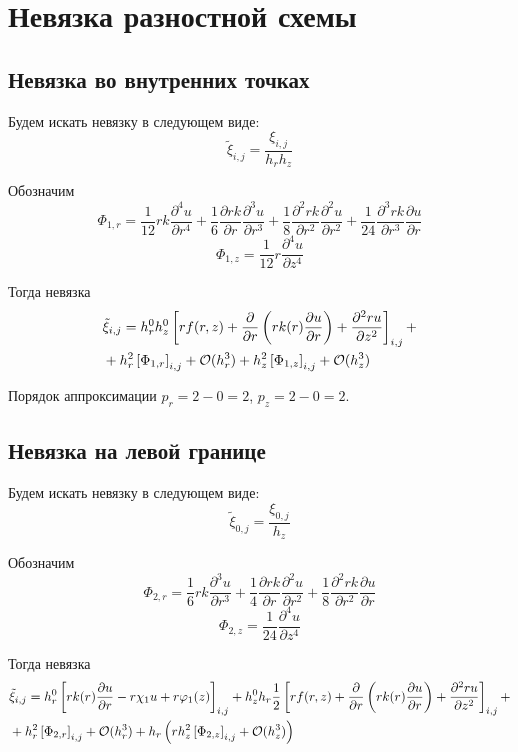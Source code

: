 \section{Невязка разностной схемы}

\subsection{Невязка во внутренних точках}

Будем искать невязку в следующем виде:
\[ \tilde{\xi}_{i, j} = \frac{\xi_{i, j}}{h_r h_z} \]

Обозначим
\[ \Phi_{1,r} = \frac{1}{12} r k \frac{\partial^4 u}{\partial r^4} + \frac{1}{6}\frac{\partial r k}{\partial r}\frac{\partial^3 u}{\partial r^3} + \frac{1}{8} \frac{\partial^2 r k}{\partial r^2}\frac{\partial^2 u}{\partial r^2} + \frac{1}{24} \frac{\partial^3 r k}{\partial r^3}\frac{\partial u}{\partial r} \]
\[ \Phi_{1,z} = \frac{1}{12} r \frac{\partial^4 u}{\partial z^4} \]

Тогда невязка
\begin{align*}
  &\tilde{\xi}_{i, j} = h_r^0 h_z^0 \left[ rf(r, z) + \pdv{}{r} \left ( r k(r) \pdv{u}{r} \right ) + \pdv[2]{ru}{z} \right]_{i, j} + \\
  & + h^2_r\left[ \Phi_{1,r} \right]_{i,j} + \mathcal{O}(h_r^3) + h^2_z \left[ \Phi_{1,z} \right]_{i, j} + \mathcal{O}(h_z^3)
\end{align*}

Порядок аппроксимации $ p_r = 2 - 0 = 2 $, $ p_z = 2 - 0 = 2 $.

\subsection{Невязка на левой границе}

Будем искать невязку в следующем виде:
\[ \tilde{\xi}_{0, j} = \frac{\xi_{0, j}}{h_z} \]

Обозначим
\[ \Phi_{2,r} = \frac{1}{6} rk \frac{\partial^3 u}{ \partial r^3} +   \frac{1}{4} \frac{\partial rk}{ \partial r} \frac{\partial^2 u}{ \partial r^2} + \frac{1}{8} \frac{\partial^2 rk}{ \partial r^2} \frac{\partial u}{ \partial r} \]
\[ \Phi_{2,z} = \frac{1}{24} \frac{\partial^4 u}{ \partial z^4} \]

Тогда невязка
\begin{align*}
  &\tilde{\xi}_{i, j} = h_r^0 \left[ r k(r) \pdv{u}{r} - r \chi_1 u + r \varphi_1(z) \right]_{i, j} + h_z^0 h_r \frac{1}{2} \left[ rf(r, z) + \pdv{}{r} \left ( r k(r) \pdv{u}{r} \right ) + \pdv[2]{ru}{z} \right]_{i, j} + \\
  & + h^2_r \left[ \Phi_{2,r} \right]_{i ,j} + \mathcal{O}(h^3_r) + h_r\left( r h^2_z\left[ \Phi_{2,z} \right]_{i, j}
  + \mathcal{O}(h^3_z) \right)
\end{align*}

